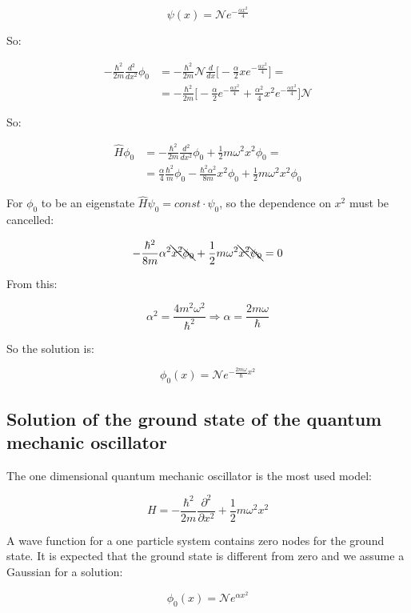   $$\psi(x) = \mathcal{N}e^{-\frac{\alpha x^2}{4}}$$

  So:

  \begin{align*}
    -\frac{\hbar^2}{2m}\frac{d{^2}}{d{x^2}}\phi_0 &= -\frac{\hbar^2}{2m}\mathcal{N}\frac{d{}}{d{x}}\biggl[-\frac{\alpha}{2}xe^{-\frac{\alpha x^2}{4}}\biggr]=\\
                                                  &= -\frac{\hbar^2}{2m}\biggl[-\frac{\alpha}{2}e^{-\frac{\alpha x^2}{4}}+\frac{\alpha^2}{4}x^2e^{-\frac{\alpha x^2}{4}}\biggr]\mathcal{N}
  \end{align*}

  So:

  \begin{align*}
    \hat{H}\phi_0 &= -\frac{\hbar^2}{2m}\frac{d{^2}}{d{x^2}}\phi_0 + \frac{1}{2}m\omega^2x^2\phi_0=\\
                  &= \frac{\alpha}{4}\frac{\hbar^2}{m}\phi_0 -\frac{\hbar^2\alpha^2}{8m}x^2\phi_0 + \frac{1}{2}m\omega^2x^2\phi_0
  \end{align*}

  For $\phi_0$ to be an eigenstate $\hat{H}\psi_0 = const\cdot\psi_0$, so the dependence on $x^2$ must be cancelled:

  $$-\frac{\hbar^2}{8m}\alpha^2\bcancel{x^2}\bcancel{\phi_0} + \frac{1}{2}m\omega^2\bcancel{x^2}\bcancel{\psi_0} = 0$$

  From this:

  $$\alpha^2 = \frac{4m^2\omega^2}{\hbar^2}\Rightarrow\alpha=\frac{2m\omega}{\hbar}$$

  So the solution is:

  $$\phi_0(x) = \mathcal{N}e^{-\frac{2m\omega}{\hbar}x^2}$$

  \subsection{Solution of the ground state of the quantum mechanic oscillator}
  The one dimensional quantum mechanic oscillator is the most used model:

  $$H = -\frac{\hbar^2}{2m}\frac{\partial^2}{\partial x^2} + \frac{1}{2}m\omega^2x^2$$

  A wave function for a one particle system contains zero nodes for the ground state.
  It is expected that the ground state is different from zero and we assume a Gaussian for a solution:

  $$\phi_0(x) = \mathcal{N} e^{\alpha x^2}$$

